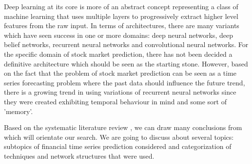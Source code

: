 Deep learning at its core is more of an abstract concept representing a class of machine learning that uses multiple layers to progressively extract higher level features from the raw input. In terms of architectures, there are many variants which have seen success in one or more domains: deep neural networks, deep belief networks, recurrent neural networks and convolutional neural networks. For the specific domain of stock market prediction, there has not been decided a definitive architecture which should be seen as the starting stone. However, based on the fact that the problem of stock market prediction can be seen as a time series forecasting problem where the past data should influence the future trend, there is a growing trend in using variations of recurrent neural networks since they were created exhibiting temporal behaviour in mind and some sort of 'memory'. 

\vspace{5mm}

Based on the systematic literature review \cite{sezer2020financial}, we can draw many conclusions from which will orientate our search. We are going to discuss about several topics: subtopics of financial time series prediction considered and categorization of techniques and network structures that were used.

